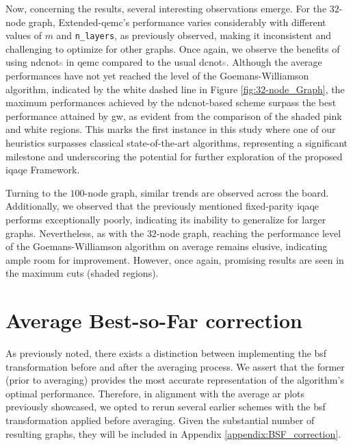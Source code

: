 Now, concerning the results, several interesting observations emerge. For the $32$-node graph, Extended-\acrshort{qemc}'s performance varies considerably with different values of $m$ and \texttt{n\_layers}, as previously observed, making it inconsistent and challenging to optimize for other graphs. Once again, we observe the benefits of using \acrshort{ndcnot}\textcolor{gray}{s} in \acrshort{qemc} compared to the usual \acrshort{dcnot}\textcolor{gray}{s}. Although the average performances have not yet reached the level of the Goemans-Williamson algorithm, indicated by the white dashed line in Figure \ref{fig:32-node_Graph}, the maximum performances achieved by the \acrshort{ndcnot}-based scheme surpass the best performance attained by \acrshort{gw}, as evident from the comparison of the shaded pink and white regions. This marks the first instance in this study where one of our heuristics surpasses classical state-of-the-art algorithms, representing a significant milestone and underscoring the potential for further exploration of the proposed \acrshort{iqaqe} Framework.

Turning to the $100$-node graph, similar trends are observed across the board. Additionally, we observed that the previously mentioned fixed-parity \acrshort{iqaqe} performs exceptionally poorly, indicating its inability to generalize for larger graphs. Nevertheless, as with the $32$-node graph, reaching the performance level of the Goemans-Williamson algorithm on average remains elusive, indicating ample room for improvement. However, once again, promising results are seen in the maximum cuts (shaded regions).






\section{Average Best-so-Far correction}
\label{section:Avg_BSF_correction}



As previously noted, there exists a distinction between implementing the \acrshort{bsf} transformation before and after the averaging process. We assert that the former (prior to averaging) provides the most accurate representation of the algorithm's optimal performance. Therefore, in alignment with the average \acrshort{ar} plots previously showcased, we opted to rerun several earlier schemes with the \acrshort{bsf} transformation applied before averaging. Given the substantial number of resulting graphs, they will be included in Appendix \ref{appendix:BSF_correction}.

